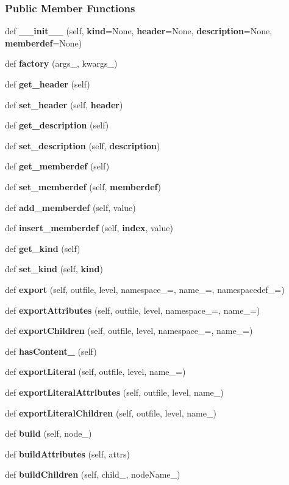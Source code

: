\subsubsection*{Public Member Functions}
\begin{DoxyCompactItemize}
\item 
def {\bf \+\_\+\+\_\+init\+\_\+\+\_\+} (self, {\bf kind}=None, {\bf header}=None, {\bf description}=None, {\bf memberdef}=None)
\item 
def {\bf factory} (args\+\_\+, kwargs\+\_\+)
\item 
def {\bf get\+\_\+header} (self)
\item 
def {\bf set\+\_\+header} (self, {\bf header})
\item 
def {\bf get\+\_\+description} (self)
\item 
def {\bf set\+\_\+description} (self, {\bf description})
\item 
def {\bf get\+\_\+memberdef} (self)
\item 
def {\bf set\+\_\+memberdef} (self, {\bf memberdef})
\item 
def {\bf add\+\_\+memberdef} (self, value)
\item 
def {\bf insert\+\_\+memberdef} (self, {\bf index}, value)
\item 
def {\bf get\+\_\+kind} (self)
\item 
def {\bf set\+\_\+kind} (self, {\bf kind})
\item 
def {\bf export} (self, outfile, level, namespace\+\_\+=\textquotesingle{}\textquotesingle{}, name\+\_\+=\textquotesingle{}, namespacedef\+\_\+=\textquotesingle{}\textquotesingle{})
\item 
def {\bf export\+Attributes} (self, outfile, level, namespace\+\_\+=\textquotesingle{}\textquotesingle{}, name\+\_\+=\textquotesingle{})
\item 
def {\bf export\+Children} (self, outfile, level, namespace\+\_\+=\textquotesingle{}\textquotesingle{}, name\+\_\+=\textquotesingle{})
\item 
def {\bf has\+Content\+\_\+} (self)
\item 
def {\bf export\+Literal} (self, outfile, level, name\+\_\+=\textquotesingle{})
\item 
def {\bf export\+Literal\+Attributes} (self, outfile, level, name\+\_\+)
\item 
def {\bf export\+Literal\+Children} (self, outfile, level, name\+\_\+)
\item 
def {\bf build} (self, node\+\_\+)
\item 
def {\bf build\+Attributes} (self, attrs)
\item 
def {\bf build\+Children} (self, child\+\_\+, node\+Name\+\_\+)
\end{DoxyCompactItemize}
